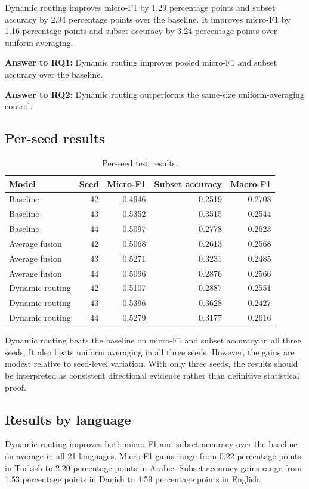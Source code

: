 \documentclass[review,12pt]{elsarticle}
\begin{document}
Dynamic routing improves micro-F1 by 1.29 percentage points and subset accuracy by 2.94 percentage points over the baseline. It improves micro-F1 by 1.16 percentage points and subset accuracy by 3.24 percentage points over uniform averaging.

\textbf{Answer to RQ1:} Dynamic routing improves pooled micro-F1 and subset accuracy over the baseline.

\textbf{Answer to RQ2:} Dynamic routing outperforms the same-size uniform-averaging control.

\subsection{Per-seed results}
\begin{table}[htbp]
\centering
\caption{Per-seed test results.}
\label{tab:seeds}
\begin{tabular}{lrrrr}
\toprule
Model & Seed & Micro-F1 & Subset accuracy & Macro-F1 \\
\midrule
Baseline & 42 & 0.4946 & 0.2519 & 0.2708 \\
Baseline & 43 & 0.5352 & 0.3515 & 0.2544 \\
Baseline & 44 & 0.5097 & 0.2778 & 0.2623 \\
Average fusion & 42 & 0.5068 & 0.2613 & 0.2568 \\
Average fusion & 43 & 0.5271 & 0.3231 & 0.2485 \\
Average fusion & 44 & 0.5096 & 0.2876 & 0.2566 \\
Dynamic routing & 42 & 0.5107 & 0.2887 & 0.2551 \\
Dynamic routing & 43 & 0.5396 & 0.3628 & 0.2427 \\
Dynamic routing & 44 & 0.5279 & 0.3177 & 0.2616 \\
\bottomrule
\end{tabular}
\end{table}

Dynamic routing beats the baseline on micro-F1 and subset accuracy in all three seeds. It also beats uniform averaging in all three seeds. However, the gains are modest relative to seed-level variation. With only three seeds, the results should be interpreted as consistent directional evidence rather than definitive statistical proof.

\subsection{Results by language}
Dynamic routing improves both micro-F1 and subset accuracy over the baseline on average in all 21 languages. Micro-F1 gains range from 0.22 percentage points in Turkish to 2.20 percentage points in Arabic. Subset-accuracy gains range from 1.53 percentage points in Danish to 4.59 percentage points in English.
\end{document}
